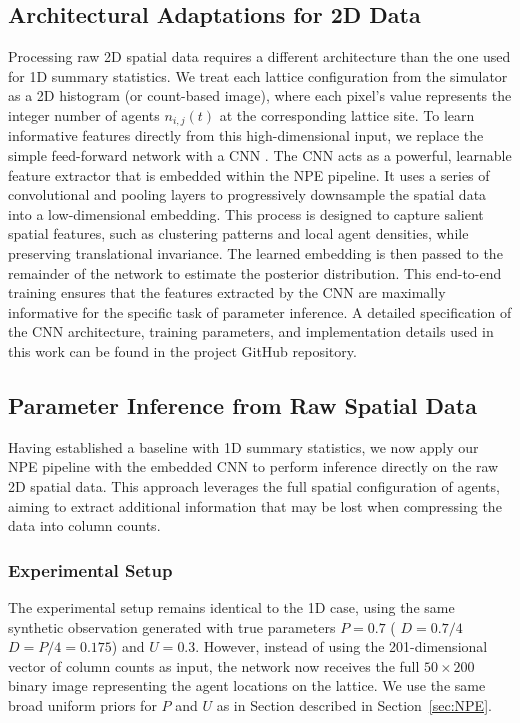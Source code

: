\documentclass{article}
\providecommand{\DIFaddtex}[1]{{\protect\color{blue} \sf #1}} %
\providecommand{\DIFdeltex}[1]{{\protect\color{red} \scriptsize #1}} %
\providecommand{\DIFaddbegin}{} %
\providecommand{\DIFaddend}{} %
\providecommand{\DIFdelbegin}{} %
\providecommand{\DIFdelend}{} %
\providecommand{\DIFadd}[1]{\texorpdfstring{\DIFaddtex{#1}}{#1}} %
\providecommand{\DIFdel}[1]{\texorpdfstring{\DIFdeltex{#1}}{}} %
\newcommand{\DIFscaledelfig}{0.5}
\newlength{\DIFdelgraphicswidth} %
\newlength{\DIFdelgraphicsheight} %
\newcommand{\DIFaddincludegraphics}[2][]{{\color{blue}\fbox{\DIFOincludegraphics[#1]{#2}}}} %
\newcommand{\DIFdelincludegraphics}[2][]{%
\sbox{\DIFdelgraphicsbox}{\DIFOincludegraphics[#1]{#2}}%
\settoboxwidth{\DIFdelgraphicswidth}{\DIFdelgraphicsbox} %
\settoboxtotalheight{\DIFdelgraphicsheight}{\DIFdelgraphicsbox} %
\scalebox{\DIFscaledelfig}{%
\parbox[b]{\DIFdelgraphicswidth}{\usebox{\DIFdelgraphicsbox}\\[-\baselineskip] \rule{\DIFdelgraphicswidth}{0em}}\llap{\resizebox{\DIFdelgraphicswidth}{\DIFdelgraphicsheight}{%
\setlength{\unitlength}{\DIFdelgraphicswidth}%
\begin{picture}(1,1)%
\thicklines\linethickness{2pt} %
{\color[rgb]{1,0,0}\put(0,0){\framebox(1,1){}}}%
{\color[rgb]{1,0,0}\put(0,0){\line( 1,1){1}}}%
{\color[rgb]{1,0,0}\put(0,1){\line(1,-1){1}}}%
\end{picture}%
}\hspace*{3pt}}} %
} %
\DeclareRobustCommand{\DIFaddbegin}{\DIFOaddbegin \let\includegraphics\DIFaddincludegraphics} %
\DeclareRobustCommand{\DIFaddend}{\DIFOaddend \let\includegraphics\DIFOincludegraphics} %
\DeclareRobustCommand{\DIFdelbegin}{\DIFOdelbegin \let\includegraphics\DIFdelincludegraphics} %
\DeclareRobustCommand{\DIFdelend}{\DIFOaddend \let\includegraphics\DIFOincludegraphics} %
\begin{document}
\DIFdelbegin \subsection{\DIFdel{Architectural Adaptations for 2D Data}}
\addtocounter{subsection}{-1}%
\DIFdel{Processing raw 2D spatial data requires a different architecture than the one used for 1D summary statistics. We treat each lattice configuration from the simulator as a 2D histogram (or count-based image), where each pixel's value represents the integer number of agents $n_{i,j}(t)$ at the corresponding lattice site. To learn informative features directly from this high-dimensional input, we replace the simple feed-forward network with a CNN \citep{lecun1998,krizhevsky2012,goodfellow2016}. The CNN acts as a powerful, learnable feature extractor that is embedded within the NPE pipeline. It uses a series of convolutional and pooling layers to progressively downsample the spatial data into a low-dimensional embedding. This process is designed to capture salient spatial features, such as clustering patterns and local agent densities, while preserving translational invariance. The learned embedding is then passed to the remainder of the network to estimate the posterior distribution. This end-to-end training ensures that the features extracted by the CNN are maximally informative for the specific task of parameter inference. A detailed specification of the CNN architecture, training parameters, and implementation details used in this work can be found in the project GitHub repository.
}%

\subsection{\DIFdel{Parameter Inference from Raw Spatial Data}}
\addtocounter{subsection}{-1}%

\DIFdel{Having established a baseline with 1D summary statistics, we now apply our NPE pipeline with the embedded CNN to perform inference directly on the raw 2D spatial data. This approach leverages the full spatial configuration of agents, aiming to extract additional information that may be lost when compressing the data into column counts.
}%

\subsubsection{\DIFdel{Experimental Setup}}
\addtocounter{subsubsection}{-1}%
\DIFdelend The experimental setup remains identical to the 1D case, using the same synthetic observation generated with true parameters $P = 0.7$ (\DIFdelbegin \DIFdel{$D=0.7/4$}\DIFdelend \DIFaddbegin \DIFadd{$D = P/4 = 0.175$}\DIFaddend ) and $U = 0.3$. However, instead of using the 201-dimensional vector of column counts as input, the network now receives the full $50 \times 200$ binary image representing the agent locations on the lattice. We use the same broad uniform priors for $P$ and $U$ as \DIFdelbegin \DIFdel{in Section }\DIFdelend \DIFaddbegin \DIFadd{described in Section~}\DIFaddend \ref{sec:NPE}.
\end{document}
